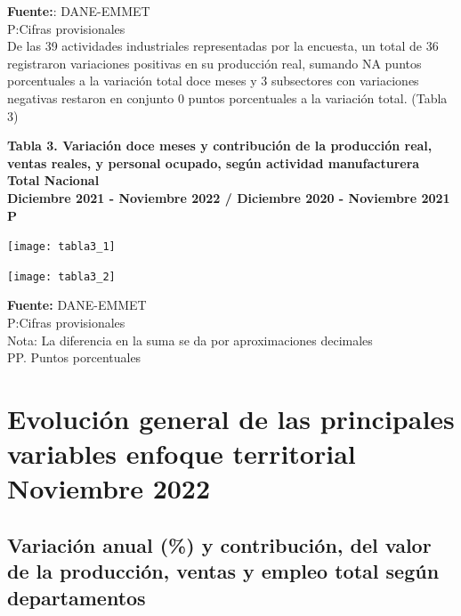 \documentclass[
]{article}
\begin{document}
\textbf{Fuente:}: DANE-EMMET\\
P:Cifras provisionales\\

De las 39 actividades industriales representadas por la encuesta, un
total de 36 registraron variaciones positivas en su producción real,
sumando NA puntos porcentuales a la variación total doce meses y 3
subsectores con variaciones negativas restaron en conjunto 0 puntos
porcentuales a la variación total. (Tabla 3)\\

\newpage

\textbf{Tabla 3. Variación doce meses y contribución de la producción real, ventas reales, y personal ocupado, según actividad manufacturera}\\
\textbf{Total Nacional}\\
\textbf{Diciembre 2021 - Noviembre 2022 / Diciembre 2020 - Noviembre 2021 P}

\begin{center}\texttt{[image: tabla3\_1]} \end{center}

\begin{center}\texttt{[image: tabla3\_2]} \end{center}

\textbf{Fuente:} DANE-EMMET\\
P:Cifras provisionales\\
Nota: La diferencia en la suma se da por aproximaciones decimales\\
PP. Puntos porcentuales\\

\hypertarget{evoluciuxf3n-general-de-las-principales-variables-enfoque-territorial-noviembre-2022}{%
\section{Evolución general de las principales variables enfoque
territorial Noviembre
2022}\label{evoluciuxf3n-general-de-las-principales-variables-enfoque-territorial-noviembre-2022}}

\hypertarget{variaciuxf3n-anual-y-contribuciuxf3n-del-valor-de-la-producciuxf3n-ventas-y-empleo-total-seguxfan-departamentos}{%
\subsection{Variación anual (\%) y contribución, del valor de la
producción, ventas y empleo total según
departamentos}\label{variaciuxf3n-anual-y-contribuciuxf3n-del-valor-de-la-producciuxf3n-ventas-y-empleo-total-seguxfan-departamentos}}
\end{document}
